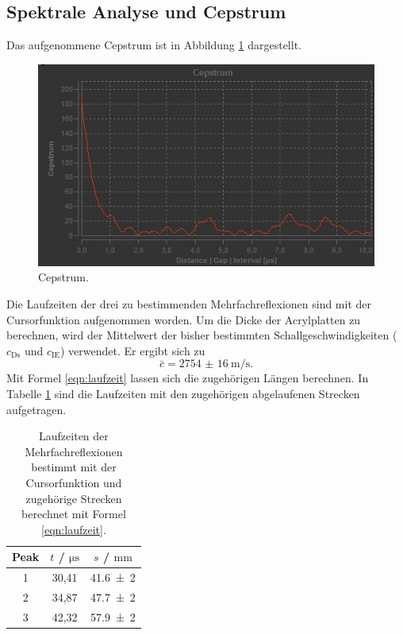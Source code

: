 \subsection{Spektrale Analyse und Cepstrum}
Das aufgenommene Cepstrum ist in Abbildung \ref{fig:cepstrum} dargestellt.
\begin{figure}
  \centering
  \includegraphics[width=\textwidth]{Messdaten/cepstrum.jpg}
  \caption{Cepstrum.}
  \label{fig:cepstrum}
\end{figure}
Die Laufzeiten der drei zu bestimmenden Mehrfachreflexionen sind mit der Cursorfunktion
aufgenommen worden. Um die Dicke der Acrylplatten zu berechnen, wird der Mittelwert der
bisher bestimmten Schallgeschwindigkeiten ($c_\mathrm{Ds}$ und $c_\mathrm{IE}$) verwendet. Er ergibt sich zu
\begin{equation*}
	\bar{c} = \SI{2754(16)}{\meter\per\second} \mathrm{.}
\end{equation*}
Mit Formel \eqref{eqn:laufzeit} lassen sich die zugehörigen Längen berechnen.
In Tabelle \ref{tab:cepstrum} sind die Laufzeiten mit den zugehörigen abgelaufenen Strecken
aufgetragen.
\begin{table}
\centering
	\caption{Laufzeiten der Mehrfachreflexionen bestimmt mit der Cursorfunktion und zugehörige Strecken berechnet mit Formel \eqref{eqn:laufzeit}.}
\label{tab:cepstrum}
	\begin{tabular}{ccc}
	\toprule
	Peak & $t$ / $\si{\micro\second}$ & $s$ / $\si{\milli\meter}$ \\
	\midrule
		1 & 30,41 & \num{41,6(2)} \\
		2 & 34,87 & \num{47,7(2)} \\
		3 & 42,32 & \num{57,9(2)} \\
	\bottomrule
	\end{tabular}
\end{table}
